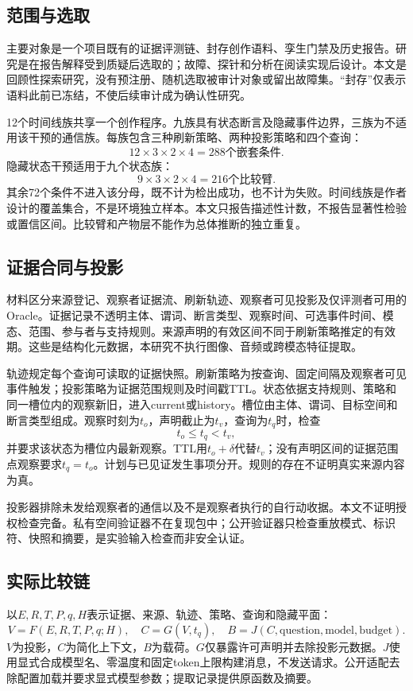 \documentclass[UTF8,11pt]{ctexart}
\begin{document}
\subsection{范围与选取}
主要对象是一个项目既有的证据评测链、封存创作语料、孪生门禁及历史报告。研究是在报告解释受到质疑后选取的；故障、探针和分析在阅读实现后设计。本文是回顾性探索研究，没有预注册、随机选取被审计对象或留出故障集。“封存”仅表示语料此前已冻结，不使后续审计成为确认性研究。

12个时间线族共享一个创作程序。九族具有状态断言及隐藏事件边界，三族为不适用该干预的通信族。每族包含三种刷新策略、两种投影策略和四个查询：
\[
12\times3\times2\times4=288\text{个嵌套条件}.
\]
隐藏状态干预适用于九个状态族：
\[
9\times3\times2\times4=216\text{个比较臂}.
\]
其余72个条件不进入该分母，既不计为检出成功，也不计为失败。时间线族是作者设计的覆盖集合，不是环境独立样本。本文只报告描述性计数，不报告显著性检验或置信区间。比较臂和产物层不能作为总体推断的独立重复\cite{hurlbert}。

\subsection{证据合同与投影}
材料区分来源登记、观察者证据流、刷新轨迹、观察者可见投影及仅评测者可用的Oracle。证据记录不透明主体、谓词、断言类型、观察时间、可选事件时间、模态、范围、参与者与支持规则。来源声明的有效区间不同于刷新策略推定的有效期。这些是结构化元数据，本研究不执行图像、音频或跨模态特征提取。

轨迹规定每个查询可读取的证据快照。刷新策略为按查询、固定间隔及观察者可见事件触发；投影策略为证据范围规则及时间戳TTL。状态依据支持规则、策略和同一槽位内的观察新旧，进入current或history。槽位由主体、谓词、目标空间和断言类型组成。观察时刻为\(t_o\)，声明截止为\(t_v\)，查询为\(t_q\)时，检查
\[
t_o\leq t_q<t_v,
\]
并要求该状态为槽位内最新观察。TTL用\(t_o+\delta\)代替\(t_v\)；没有声明区间的证据范围点观察要求\(t_q=t_o\)。计划与已见证发生事项分开。规则的存在不证明真实来源内容为真。

投影器排除未发给观察者的通信以及不是观察者执行的自行动收据。本文不证明授权检查完备。私有空间验证器不在复现包中；公开验证器只检查重放模式、标识符、快照和摘要，是实验输入检查而非安全认证。

\subsection{实际比较链}
以\(E,R,T,P,q,H\)表示证据、来源、轨迹、策略、查询和隐藏平面：
\[
V=F(E,R,T,P,q;H),\quad C=G(V,t_q),\quad
B=J(C,\mathrm{question},\mathrm{model},\mathrm{budget}).
\]
\(V\)为投影，\(C\)为简化上下文，\(B\)为载荷。\(G\)仅暴露许可声明并去除投影元数据。\(J\)使用显式合成模型名、零温度和固定token上限构建消息，不发送请求。公开适配去除配置加载并要求显式模型参数；提取记录提供原函数及摘要。
\end{document}
